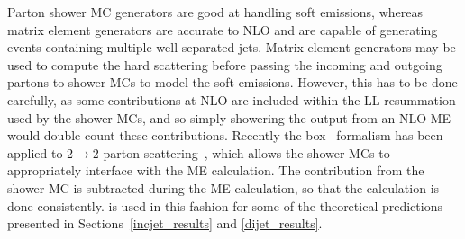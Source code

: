 Parton shower MC generators are good at handling soft emissions, whereas matrix element generators are accurate to NLO and are capable of generating events containing multiple well-separated jets. Matrix element generators may be used to compute the hard scattering before passing the incoming and outgoing partons to shower MCs to model the soft emissions. However, this has to be done carefully, as some contributions at NLO are included within the LL resummation used by the shower MCs, and so simply showering the output from an NLO ME would double count these contributions. Recently the \POWHEG box~\cite{powheg_box} formalism has been applied to 2$\rightarrow$2 parton scattering~\cite{powheg_box_jetpair}, which allows the shower MCs to appropriately interface with the ME calculation. The contribution from the shower MC is subtracted during the ME calculation, so that the calculation is done consistently. \powheg is used in this fashion for some of the theoretical predictions presented in Sections~\ref{incjet_results} and \ref{dijet_results}.





%
%










%
%
%
%
%
%
%
%
%
%
%
%







